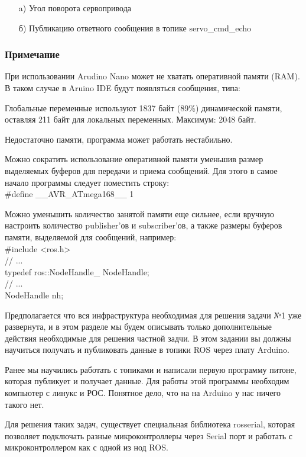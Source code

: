 \begin{enumerate}
    \item[a)] Угол поворота сервопривода
    \item[б)] Публикацию ответного сообщения в топике servo\_cmd\_echo 
\end{enumerate}

\subsubsection*{Примечание}
При использовании Arudino Nano может не хватать оперативной памяти (RAM). В таком случае в Aruino IDE 
будут появляться сообщения, типа:

Глобальные переменные используют 1837 байт (89\%) динамической памяти, оставляя 211 байт для локальных 
переменных. Максимум: 2048 байт.

Недостаточно памяти, программа может работать нестабильно.

Можно сократить использование оперативной памяти уменьшив размер выделяемых 
буферов для передачи и приема сообщений. Для этого в самое начало программы следует поместить строку:\\
\#define \_\_AVR\_ATmega168\_\_ 1

Можно уменьшить количество занятой памяти еще сильнее, если вручную настроить количество publisher'ов и subscriber'ов, а также размеры буферов памяти, выделяемой для сообщений, например:\\
\#include <ros.h>\\
// ...\\
typedef ros::NodeHandle\_<ArduinoHardware, 3, 3, 100, 100> NodeHandle;\\
// ...\\
NodeHandle nh;

\solutionSection

Предполагается что вся инфраструктура необходимая для решения задачи №1 уже развернута, и в этом разделе мы будем описывать только дополнительные действия необходимые для решения частной задчи. В этом задании вы должны научиться получать и публиковать данные в топики ROS через плату Arduino.

Ранее мы научились работать с топиками и написали первую программу питоне, которая публикует и получает данные. Для работы этой программы необходим компьютер с линукс и РОС. Понятное дело, что на на Arduino у нас ничего такого нет.

Для решения таких задач, существует специальная библиотека rosserial, которая позволяет подключать разные микроконтроллеры через Serial порт и работать с микроконтроллером как с одной из нод ROS.

